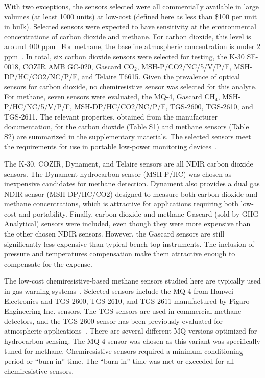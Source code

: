 \documentclass[preprint,sort&compress]{elsarticle}
\begin{document}
			With two exceptions, the sensors selected were all commercially available in large volumes (at least 1000 units) at low-cost (defined here as less than \$100 per unit in bulk). Selected sensors were expected to have sensitivity at the environmental concentrations of carbon dioxide and methane. For carbon dioxide, this level is around 400 ppm~\cite{blasing_recent_2016,dlugokencky_trends_2016}  For methane, the baseline atmospheric concentration is under 2 ppm~\cite{turner_large_2016,bamberger_spatial_2014,dlugokencky_trends_2016-1}.  In total, six carbon dioxide sensors were selected for testing, the K-30 SE-0018, COZIR AMB GC-020, Gascard CO$_{2}$, MSH-P/CO2/NC/5/V/P/F, MSH-DP/HC/CO2/NC/P/F, and Telaire T6615.  Given the prevalence of optical sensors for carbon dioxide, no chemiresistive sensor was selected for this analyte.  For methane, seven sensors were evaluated, the MQ-4, Gascard CH$_{4}$, MSH-P/HC/NC/5/V/P/F, MSH-DP/HC/CO2/NC/P/F, TGS-2600, TGS-2610, and TGS-2611.  The relevant properties, obtained from the manufacturer documentation, for the carbon dioxide (Table S1) and methane sensors (Table S2) are summarized in the supplementary materials.  The selected sensors meet the requirements for use in portable low-power monitoring devices~\cite{karpov_energy_2013}. 
			
			The K-30, COZIR, Dynament, and Telaire sensors are all NDIR carbon dioxide sensors.  The Dynament hydrocarbon sensor (MSH-P/HC) was chosen as inexpensive candidates for methane detection.  Dynament also provides a dual gas NDIR sensor (MSH-DP/HC/CO2) designed to measure both carbon dioxide and methane concentrations, which is attractive for applications requiring both low-cost and portability.  Finally, carbon dioxide and methane Gascard (sold by GHG Analytical) sensors were included, even though they were more expensive than the other chosen NDIR sensors.   However, the Gascard sensors are still significantly less expensive than typical bench-top instruments. The inclusion of pressure and temperatures compensation make them attractive enough to compensate for the expense.  
			
			The low-cost chemiresistive-based methane sensors studied here are typically used in gas warning systems~\cite{chiu_towards_2013}.  Selected sensors include the MQ-4 from Hanwei Electronics and TGS-2600, TGS-2610, and TGS-2611 manufactured by Figaro Engineering Inc. sensors.  The TGS sensors are used in commercial methane detectors, and the TGS-2600 sensor has been previously evaluated for atmospheric applications~\cite{eugster_performance_2012,bossche_potential_2017}.  There are several different MQ versions optimized for hydrocarbon sensing.  The MQ-4 sensor was chosen as this variant was specifically tuned for methane.  Chemiresistive sensors required a minimum conditioning period or ``burn-in'' time.  The ``burn-in'' time was met or exceeded for all chemiresistive sensors.  
	
\end{document}

